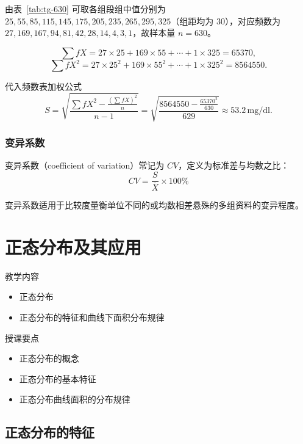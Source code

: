 \documentclass[lang=cn,10pt]{elegantbook}
\begin{document}
\begin{solution}
由表~\ref{tab:tg-630} 可取各组段组中值分别为
$25,55,85,115,145,175,205,235,265,295,325$（组距均为 $30$），对应频数为
$27,169,167,94,81,42,28,14,4,3,1$，故样本量 $n=630$。

\[
\sum fX=27\times 25+169\times 55+\cdots+1\times 325=65370,
\]
\[
\sum fX^2=27\times 25^2+169\times 55^2+\cdots+1\times 325^2=8564550.
\]

代入频数表加权公式
\[
S=\sqrt{\frac{\sum fX^2-\frac{(\sum fX)^2}{n}}{n-1}}
=\sqrt{\frac{8564550-\frac{65370^2}{630}}{629}}
\approx 53.2\,\mathrm{mg/dl}.
\]
\end{solution}

\subsection{变异系数}

变异系数（coefficient of variation）常记为 $CV$，定义为标准差与均数之比：
\begin{equation}
CV=\frac{S}{\overline{X}}\times 100\%
\end{equation}

变异系数适用于比较度量衡单位不同的或均数相差悬殊的多组资料的变异程度。

\chapter{正态分布及其应用}

\begin{introduction}
    \item 教学内容
    \begin{itemize}
        \item 正态分布
        \item 正态分布的特征和曲线下面积分布规律
    \end{itemize}
    \item 授课要点
    \begin{itemize}
        \item 正态分布的概念
        \item 正态分布的基本特征
        \item 正态分布曲线面积的分布规律
    \end{itemize}
\end{introduction}

\section{正态分布的特征}
\end{document}
